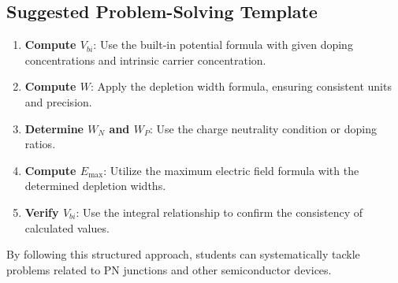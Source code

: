 \documentclass[12pt]{article}
\begin{document}
\subsection{Suggested Problem-Solving Template}
\begin{enumerate}
    \item \textbf{Compute \( V_{bi} \)}: Use the built-in potential formula with given doping concentrations and intrinsic carrier concentration.
    \item \textbf{Compute \( W \)}: Apply the depletion width formula, ensuring consistent units and precision.
    \item \textbf{Determine \( W_N \) and \( W_P \)}: Use the charge neutrality condition or doping ratios.
    \item \textbf{Compute \( E_{\max} \)}: Utilize the maximum electric field formula with the determined depletion widths.
    \item \textbf{Verify \( V_{bi} \)}: Use the integral relationship to confirm the consistency of calculated values.
\end{enumerate}

By following this structured approach, students can systematically tackle problems related to PN junctions and other semiconductor devices.
\end{document}
